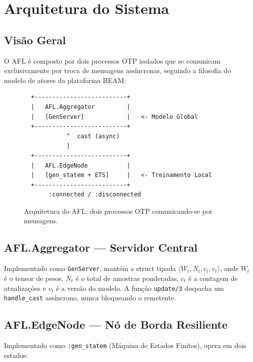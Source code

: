 \documentclass[conference,a4paper]{IEEEtran}
\begin{document}
\section{Arquitetura do Sistema}
\label{sec:arch}

\subsection{Visão Geral}

O AFL é composto por dois processos OTP isolados que se comunicam
exclusivamente por troca de mensagens assíncronas, seguindo a filosofia do
modelo de atores da plataforma BEAM:

\begin{figure}[H]
\centering
\begin{minipage}{0.9\linewidth}
\small
\begin{verbatim}
  +--------------------------+
  |   AFL.Aggregator         |
  |   [GenServer]            |   <- Modelo Global
  +--------------------------+
            ^  cast (async)
            |
  +--------------------------+
  |   AFL.EdgeNode           |
  |   [gen_statem + ETS]     |   <- Treinamento Local
  +--------------------------+
       :connected / :disconnected
\end{verbatim}
\end{minipage}
\caption{Arquitetura do AFL: dois processos OTP comunicando-se por mensagens.}
\label{fig:arch}
\end{figure}

\subsection{AFL.Aggregator --- Servidor Central}

Implementado como \texttt{GenServer}, mantém a struct tipada
$\langle W_t, N_t, c_t, v_t \rangle$, onde $W_t$ é o tensor de pesos,
$N_t$ é o total de amostras ponderadas, $c_t$ é a contagem de atualizações
e $v_t$ é a versão do modelo. A função \texttt{update/3} despacha um
\texttt{handle\_cast} assíncrono, nunca bloqueando o remetente.

\subsection{AFL.EdgeNode --- Nó de Borda Resiliente}

Implementado como \texttt{:gen\_statem} (Máquina de Estados Finitos), opera
em dois estados:
\end{document}

